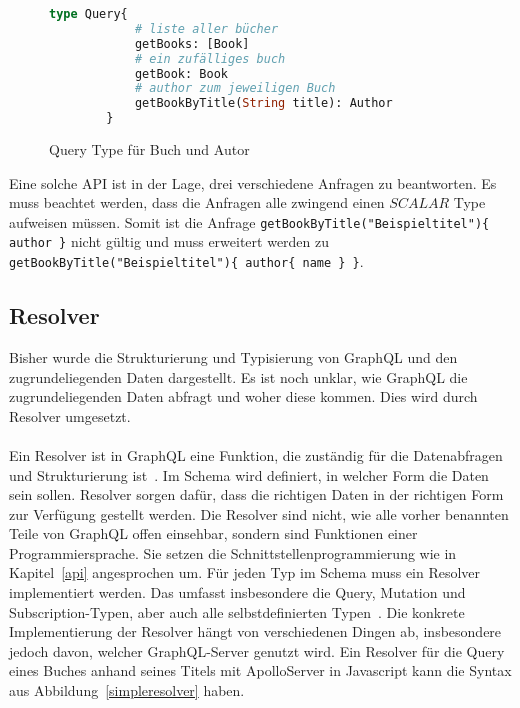 \begin{figure}[htb]
    \begin{center}
        \begin{lstlisting}[language=GraphQL]
        type Query{
            # liste aller bücher
            getBooks: [Book]
            # ein zufälliges buch
            getBook: Book
            # author zum jeweiligen Buch
            getBookByTitle(String title): Author
        }
        \end{lstlisting}
    \end{center}
    \caption{Query Type für Buch und Autor}
    \label{minimalquerytype}
\end{figure}

Eine solche API ist in der Lage, drei verschiedene Anfragen zu beantworten.
Es muss beachtet werden, dass die Anfragen alle zwingend einen $SCALAR$ Type aufweisen müssen.
Somit ist die Anfrage \verb+getBookByTitle("Beispieltitel"){ author }+ nicht gültig und muss erweitert werden zu \verb+getBookByTitle("Beispieltitel"){ author{ name } }+.

\subsection{Resolver}
\label{resolver}

Bisher wurde die Strukturierung und Typisierung von GraphQL und den zugrundeliegenden Daten dargestellt.
Es ist noch unklar, wie GraphQL die zugrundeliegenden Daten abfragt und woher diese kommen.
Dies wird durch Resolver umgesetzt.
\\
\\
Ein Resolver ist in GraphQL eine Funktion, die zuständig für die Datenabfragen und Strukturierung ist~\cite[vgl.]{apolloqgl}.
Im Schema wird definiert, in welcher Form die Daten sein sollen.
Resolver sorgen dafür, dass die richtigen Daten in der richtigen Form zur Verfügung gestellt werden.
Die Resolver sind nicht, wie alle vorher benannten Teile von GraphQL offen einsehbar, sondern sind Funktionen einer Programmiersprache.
Sie setzen die Schnittstellenprogrammierung wie in Kapitel~\ref{api} angesprochen um.
Für jeden Typ im Schema muss ein Resolver implementiert werden.
Das umfasst insbesondere die Query, Mutation und Subscription-Typen, aber auch alle selbstdefinierten Typen~\cite[vgl.]{apolloqgl}.
Die konkrete Implementierung der Resolver hängt von verschiedenen Dingen ab, insbesondere jedoch davon, welcher GraphQL-Server genutzt wird.
Ein Resolver für die Query eines Buches anhand seines Titels mit ApolloServer in Javascript kann die Syntax aus Abbildung~\ref{simpleresolver} haben.

